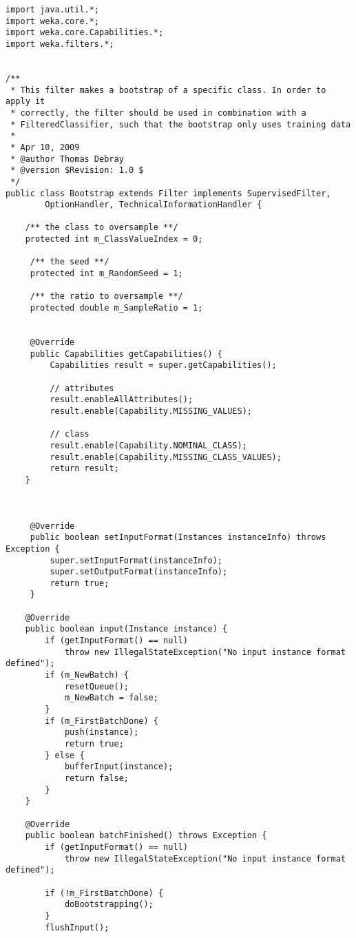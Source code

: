 \lstset{language=Java, caption=Bootstrap Filter, label=DescriptiveLabel}
\begin{lstlisting}
import java.util.*;
import weka.core.*;
import weka.core.Capabilities.*;
import weka.filters.*;


/**
 * This filter makes a bootstrap of a specific class. In order to apply it
 * correctly, the filter should be used in combination with a
 * FilteredClassifier, such that the bootstrap only uses training data
 *
 * Apr 10, 2009
 * @author Thomas Debray
 * @version $Revision: 1.0 $
 */
public class Bootstrap extends Filter implements SupervisedFilter,
        OptionHandler, TechnicalInformationHandler {

    /** the class to oversample **/
    protected int m_ClassValueIndex = 0;

     /** the seed **/
     protected int m_RandomSeed = 1;

     /** the ratio to oversample **/
     protected double m_SampleRatio = 1;


     @Override
     public Capabilities getCapabilities() {
         Capabilities result = super.getCapabilities();

         // attributes
         result.enableAllAttributes();
         result.enable(Capability.MISSING_VALUES);

         // class
         result.enable(Capability.NOMINAL_CLASS);
         result.enable(Capability.MISSING_CLASS_VALUES);
         return result;
    }
    
    

     @Override
     public boolean setInputFormat(Instances instanceInfo) throws Exception {
         super.setInputFormat(instanceInfo);
         super.setOutputFormat(instanceInfo);
         return true;
     }

    @Override
    public boolean input(Instance instance) {
        if (getInputFormat() == null)
            throw new IllegalStateException("No input instance format defined");
        if (m_NewBatch) {
            resetQueue();
            m_NewBatch = false;
        }
        if (m_FirstBatchDone) {
            push(instance);
            return true;
        } else {
            bufferInput(instance);
            return false;
        }
    }

    @Override
    public boolean batchFinished() throws Exception {
        if (getInputFormat() == null)
            throw new IllegalStateException("No input instance format defined");

        if (!m_FirstBatchDone) {
            doBootstrapping();
        }
        flushInput();


\end{lstlisting}

